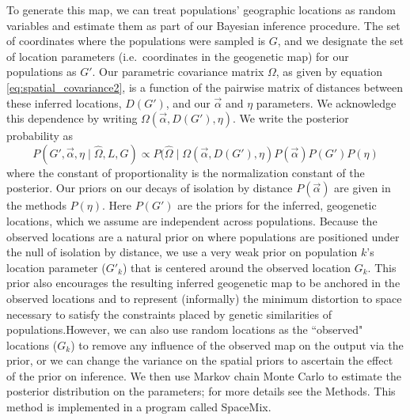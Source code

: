 \documentclass[12pt]{article}
\begin{document}
To generate this map, we can treat populations' geographic locations as random variables and estimate them as part of our Bayesian inference procedure.  The set of coordinates where the populations were sampled is $G$, and we designate the set of location parameters (i.e.\ coordinates in the geogenetic map) for our populations as $G'$. Our parametric covariance matrix $\Omega$, as given by equation \eqref{eq:spatial_covariance2}, is a function of the pairwise matrix of distances between these inferred locations, $D(G')$, and our $\vec{\alpha}$ and $\eta$ parameters.  We acknowledge this dependence by writing $\Omega(\vec{\alpha},{D}(G'),\eta)$.  We write the posterior probability as 
\begin{equation}
\label{eq:cyol_prob}
P(G', \vec{\alpha}, \eta \mid \widehat{\Omega}, L, G) \propto  P(\widehat{\Omega}  \mid \Omega(\vec{\alpha},{D}(G'),\eta ) P(\vec{\alpha}) P(G') P(\eta) 
\end{equation}
where the constant of proportionality is the normalization constant of the posterior. Our priors on our decays of isolation by distance $P(\vec{\alpha})$ are given in the methods $P(\eta)$. Here $P(G') $ are the priors for the inferred, geogenetic locations, which we assume are independent across populations.  Because the observed locations are a natural prior on where populations are positioned under the null of isolation by distance, we use a very weak prior on population $k$'s location parameter ($G'_k$) that is centered around the observed location $G_k$.
This prior also encourages the resulting inferred geogenetic map to be anchored in the observed locations and to represent (informally) the minimum distortion to space necessary to satisfy the constraints placed by genetic similarities of populations.However, we can also use random locations as the ``observed" locations ($G_k$) to remove any influence of the observed map on the output via the prior, or we can change the variance on the spatial priors to ascertain the effect of the prior on inference. 
We then use Markov chain Monte Carlo to estimate the posterior distribution on the parameters; for more details see the Methods. 
This method is implemented in a program called SpaceMix.

\end{document}
